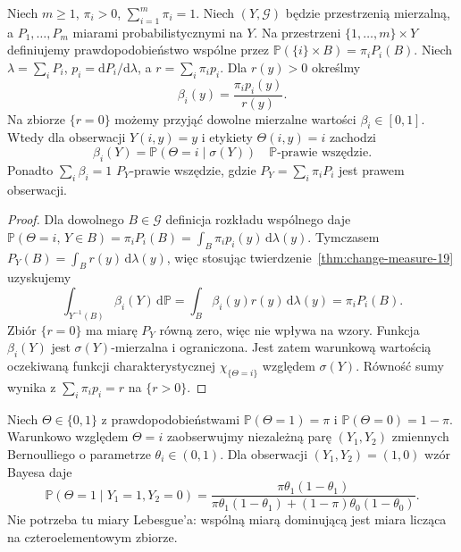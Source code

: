 \begin{twierdzenie}
\label{thm:bayes-finite-19}
Niech $m\ge1$, $\pi_i>0$, $\sum_{i=1}^m\pi_i=1$.
Niech $(Y,\mathcal G)$ będzie przestrzenią mierzalną,
a $P_1,\ldots,P_m$ miarami probabilistycznymi na $Y$.
Na przestrzeni $\{1,\ldots,m\}\times Y$ definiujemy
prawdopodobieństwo wspólne przez
$\mathbb P(\{i\}\times B)=\pi_iP_i(B)$.
Niech $\lambda=\sum_iP_i$, $p_i=\mathrm dP_i/\mathrm d\lambda$,
a $r=\sum_i\pi_i p_i$. Dla $r(y)>0$ określmy
\[
 \beta_i(y)=\frac{\pi_i p_i(y)}{r(y)}.
\]
Na zbiorze $\{r=0\}$ możemy przyjąć dowolne mierzalne
wartości $\beta_i\in[0,1]$. Wtedy dla obserwacji
$Y(i,y)=y$ i etykiety $\Theta(i,y)=i$ zachodzi
\begin{equation}\label{eq:bayes-finite-19}
 \beta_i(Y)=\mathbb P(\Theta=i\mid\sigma(Y))
 \quad\mathbb P\text{-prawie wszędzie}.
\end{equation}
Ponadto $\sum_i\beta_i=1$ $P_Y$-prawie wszędzie,
gdzie $P_Y=\sum_i\pi_iP_i$ jest prawem obserwacji.
\end{twierdzenie}
\begin{proof}
Dla dowolnego $B\in\mathcal G$ definicja rozkładu
wspólnego daje
$\mathbb P(\Theta=i,\,Y\in B)=\pi_iP_i(B)
=\int_B\pi_ip_i(y)\,\mathrm d\lambda(y)$.
Tymczasem $P_Y(B)=\int_Br(y)\,\mathrm d\lambda(y)$,
więc stosując twierdzenie~\ref{thm:change-measure-19}
uzyskujemy
\[
\int_{Y^{-1}(B)}\beta_i(Y)\,\mathrm d\mathbb P
=\int_B\beta_i(y)r(y)\,\mathrm d\lambda(y)
=\pi_iP_i(B).
\]
Zbiór $\{r=0\}$ ma miarę $P_Y$ równą zero, więc nie
wpływa na wzory. Funkcja $\beta_i(Y)$ jest
$\sigma(Y)$-mierzalna i ograniczona. Jest zatem
warunkową wartością oczekiwaną funkcji charakterystycznej
$\chi_{\{\Theta=i\}}$ względem $\sigma(Y)$.
Równość sumy wynika z $\sum_i\pi_ip_i=r$ na $\{r>0\}$.
\end{proof}

\begin{przyklad}
Niech $\Theta\in\{0,1\}$ z prawdopodobieństwami
$\mathbb P(\Theta=1)=\pi$ i $\mathbb P(\Theta=0)=1-\pi$.
Warunkowo względem $\Theta=i$ zaobserwujmy
niezależną parę $(Y_1,Y_2)$ zmiennych Bernoulliego
o parametrze $\theta_i\in(0,1)$. Dla obserwacji
$(Y_1,Y_2)=(1,0)$ wzór Bayesa daje
\[
\mathbb P(\Theta=1\mid Y_1=1,Y_2=0)
=\frac{\pi\theta_1(1-\theta_1)}
{\pi\theta_1(1-\theta_1)+(1-\pi)\theta_0(1-\theta_0)}.
\]
Nie potrzeba tu miary Lebesgue'a: wspólną miarą
dominującą jest miara licząca na czteroelementowym zbiorze.
\end{przyklad}

